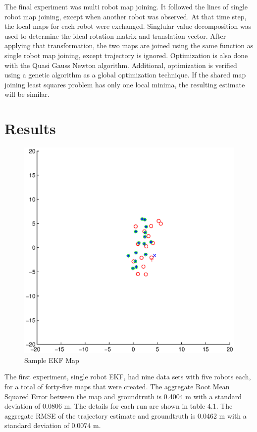 \documentclass[12pt]{report}
\begin{document}
The final experiment was multi robot map joining. It followed the
lines of single robot map joining, except when another robot was
observed. At that time step, the local maps for each robot were
exchanged. Singlular value decomposition was used to determine the
ideal rotation matrix and translation vector. After applying that
transformation, the two maps are joined using the same function as
single robot map joining, except trajectory is ignored. Optimization
is also done with the Quasi Gauss Newton algorithm. Additional,
optimization is verified using a genetic algorithm as a global
optimization technique. If the shared map joining least squares
problem has only one local minima, the resulting estimate will be
similar.

\chapter{Results}

\begin{figure}
\includegraphics{mapsample}
\caption{Sample EKF Map}
\end{figure}
The first experiment, single robot EKF, had nine data sets with five
robots each, for a total of forty-five maps that were created. The
aggregate Root Mean Squared Error between the map and groundtruth is
0.4004 m with a standard deviation of 0.0806 m. The details for each
run are shown in table 4.1. The aggregate RMSE of the trajectory
estimate and groundtruth is 0.0462 m with a standard deviation of
0.0074 m.
\end{document}
